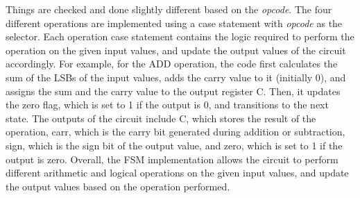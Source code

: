 Things are checked and done slightly different based on the \textit{opcode}.
The four different operations are implemented using a case statement with \textit{opcode} as the selector.
Each operation case statement contains the logic required to perform the operation on the given input values, and update the output values of the circuit accordingly.
For example, for the ADD operation, the code first calculates the sum of the LSBs of the input values, adds the carry value to it (initially 0),
and assigns the sum and the carry value to the output register C.
Then, it updates the zero flag, which is set to 1 if the output is 0, and transitions to the next state.
The outputs of the circuit include C, which stores the result of the operation,
carr, which is the carry bit generated during addition or subtraction,
sign, which is the sign bit of the output value, and zero, which is set to 1 if the output is zero.
Overall, the FSM implementation allows the circuit to perform different arithmetic and logical
operations on the given input values, and update the output values based on the operation performed.